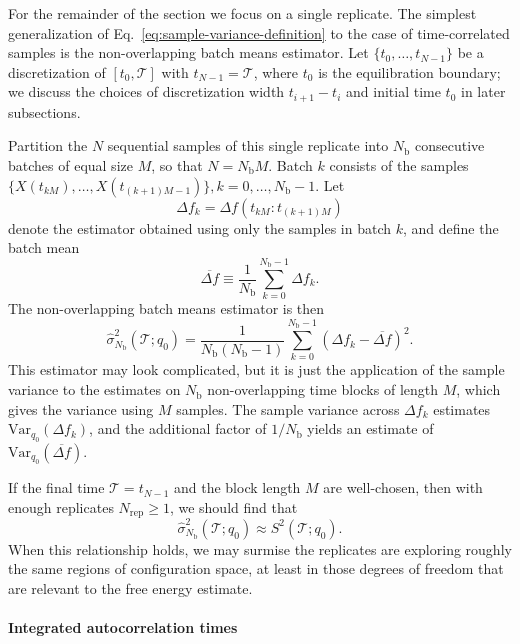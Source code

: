 For the remainder of the section we focus on a single replicate. The simplest generalization of Eq.~\ref{eq:sample-variance-definition} to the case of time-correlated samples is the non-overlapping batch means estimator. Let $\{t_0,\dots,t_{N-1}\}$ be a discretization of $[t_0,\mathcal{T}]$ with $t_{N-1}=\mathcal{T}$, where $t_0$ is the equilibration boundary;  we discuss the choices of discretization width $t_{i+1} - t_i$ and initial time $t_0$ in later subsections. 

Partition the $N$ sequential samples of this single replicate into $N_{\mathrm{b}}$ consecutive batches of equal size $M$, so that $N = N_{\mathrm{b}}M$. Batch $k$ consists of the samples $\{X(t_{kM}),\dots,X(t_{(k+1)M-1})\}, k=0,\dots,N_{\mathrm{b}}-1$. Let
\[
\Delta f_k = \Delta f(t_{kM}:t_{(k+1)M})
\]
denote the estimator obtained using only the samples in batch $k$, and define the batch mean
\[
\overline{\Delta f} \equiv \frac{1}{N_{\mathrm{b}}}\sum_{k=0}^{N_{\mathrm{b}}-1} \Delta f_k .
\]
The non-overlapping batch means estimator is then
\[
\hat\sigma_{N_{\mathrm{b}}}^2(\mathcal{T};q_0)
= \frac{1}{N_{\mathrm{b}}(N_{\mathrm{b}}-1)}\sum_{k=0}^{N_{\mathrm{b}}-1}
\left(\Delta f_k - \overline{\Delta f}\right)^2 .
\]
This estimator may look complicated, but it is just the application of the sample variance to the estimates on  $N_{\mathrm{b}}$ non-overlapping time blocks of length $M$, which gives the variance using $M$ samples. The sample variance across $\Delta f_k$ estimates $\mathrm{Var}_{q_0}(\Delta f_k)$, and the additional factor of $1/N_{\mathrm{b}}$ yields an estimate of $\mathrm{Var}_{q_0}(\overline{\Delta f})$.

If the final time $\mathcal{T}=t_{N-1}$ and the block length $M$ are well-chosen, then with enough replicates $N_{\mathrm{rep}}\geqslant 1$, we should find that
$$ \hat\sigma_{N_{\mathrm{b}}}^2(\mathcal{T}; q_0) \approx S^2(\mathcal{T} ; q_0) .$$
When this relationship holds, we may surmise the replicates are exploring roughly the same regions of configuration space, at least in those degrees of freedom that are relevant to the free energy estimate. 

\paragraph{Integrated autocorrelation times}

